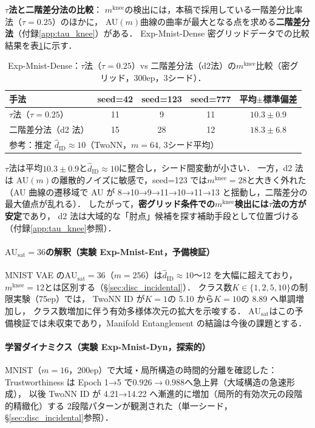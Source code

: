 \documentclass[11pt,a4paper]{jsarticle}
\newcommand{\AUsat}{\mathrm{AU}_{\mathrm{sat}}}
\newcommand{\mknee}{m^{\mathrm{knee}}}
\begin{document}
\noindent
\textbf{$\tau$法と二階差分法の比較}：
$\mknee$の検出には，本稿で採用している一階差分比率法（$\tau = 0.25$）のほかに，
AU$(m)$曲線の曲率が最大となる点を求める\textbf{二階差分法}（付録\ref{app:tau_knee}）がある．
Exp-Mnist-Dense 密グリッドデータでの比較結果を表\ref{tab:el_knee_compare}に示す．

\begin{table}[H]
\centering
\caption{Exp-Mnist-Dense：$\tau$法（$\tau=0.25$）vs 二階差分法（d2法）の$\mknee$比較（密グリッド，300ep，3シード）．}
\label{tab:el_knee_compare}
\small
\begin{tabular}{lcccc}
\toprule
手法 & seed=42 & seed=123 & seed=777 & 平均$\pm$標準偏差 \\
\midrule
$\tau$法（$\tau=0.25$） & 11 & 9  & 11 & $10.3 \pm 0.9$ \\
二階差分法（d2 法）     & 15 & 28 & 12 & $18.3 \pm 6.8$ \\
\midrule
\multicolumn{5}{l}{参考：推定 $\hat{d}_\mathrm{ID} \approx 10$（TwoNN，$m=64$, 3シード平均）} \\
\bottomrule
\end{tabular}
\end{table}

$\tau$法は平均$10.3 \pm 0.9$と$\hat{d}_\mathrm{ID} \approx 10$に整合し，シード間変動が小さい．
一方，d2 法は AU$(m)$の離散的ノイズに敏感で，seed=123 では$\mknee = 28$と大きく外れた
（AU 曲線の遷移域で AU が 8→10→9→11→10→11→13 と揺動し，二階差分の最大値点が乱れる）．
したがって，\textbf{密グリッド条件での$\mknee$検出には$\tau$法の方が安定}であり，
d2 法は大域的な「肘点」候補を探す補助手段として位置づける（付録\ref{app:tau_knee}参照）．

\paragraph{$\AUsat = 36$の解釈（実験 Exp-Mnist-Ent，予備検証）}
MNIST VAE の$\AUsat = 36$（$m=256$）は$\hat{d}_\mathrm{ID} \approx 10$〜12 を大幅に超えており，
$\mknee = 12$とは区別する（§\ref{sec:disc_incidental}）．
クラス数$K \in \{1,2,5,10\}$の制限実験（75ep）では，
TwoNN ID が$K=1$の 5.10 から$K=10$の 8.89 へ単調増加し，
クラス数増加に伴う有効多様体次元の拡大を示唆する．
$\AUsat$はこの予備検証では未収束であり，Manifold Entanglement の結論は今後の課題とする．

\paragraph{学習ダイナミクス（実験 Exp-Mnist-Dyn，探索的）}
MNIST（$m=16$，200ep）で大域・局所構造の時間的分離を確認した：
Trustworthiness は Epoch 1→5 で$0.926 \to 0.988$へ急上昇（大域構造の急速形成），
以後 TwoNN ID が 4.21→14.22 へ漸進的に増加（局所的有効次元の段階的精緻化）する
2段階パターンが観測された（単一シード，§\ref{sec:disc_incidental}参照）．
\end{document}
